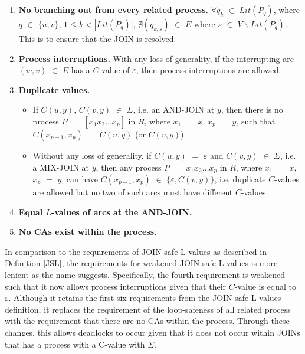 \begin{defn}
\begin{itemize}
\begin{enumerate}
            \item \textbf{No branching out from every related process.} $ 
            \forall q_k $ $ \in $ $ Lit(P_q) $, where $ q $ $ \in $ $ \{u,v\} $, $ 1 \leq k < |Lit(P_q)| $, $ \nexists (q_{k,s}) $ $ \in $ $ E $ where $ s $ $ \in $ $ V \backslash Lit(P_q) $. This is to ensure that the JOIN is resolved.
            \item \textbf{Process interruptions.} With any loss of generality, if the interrupting arc $ (w,v) $ $ \in $ $ E $ has a $ C $-value of $ \varepsilon $, then process interruptions are allowed.
            \item \textbf{Duplicate values.} 
            \begin{itemize}
                \item If $ C(u,y) $, $ C(v,y) $ $ \in $ $ \Sigma $, i.e. an AND-JOIN at $ y $, then there is no process $ P $ $ = $ $ [x_1 x_2 \ldots x_p] $ in $ R $, where $ x_1 $ $ = $ $ x $, $ x_p $ $ = $ $ y $, such that $ C(x_{p-1}, x_p ) $ $ = $ $ C(u,y) $ (or $ C(v,y) $).
                \item Without any loss of generality, if $ C(u,y) $ $ = $ $ \varepsilon $ and $ C(v,y) $ $ \in $ $ \Sigma $, i.e. a MIX-JOIN at $ y $, then any process $ P $ $ = $ $ x_1 x_2 \ldots x_p $ in $ R $, where $ x_1 $ $ = $ $ x $, $ x_p $ $ = $ $ y $, can have $ C(x_{p-1},x_p) $ $ \in $ $ \{ \varepsilon, C(v,y) \} $, i.e. duplicate $ C $-values are allowed but no two of such arcs must have different $ C $-values.
            \end{itemize}
            \item \textbf{Equal $ L $-values of arcs at the AND-JOIN.}
            \item \textbf{No CAs exist within the process.} 
        \end{enumerate}
    \end{itemize}
\end{defn}

In comparison to the requirements of JOIN-safe L-values as described in Definition \ref{JSL}, the requirements for weakened JOIN-safe L-values is more lenient as the name suggests. Specifically, the fourth requirement is weakened such that it now allows process interruptions given that their $ C $-value is equal to $ \varepsilon $. Although it retains the first six requirements from the JOIN-safe L-values definition, it replaces the requirement of the loop-safeness of all related process with the requirement that there are no CAs within the process. Through these changes, this allows deadlocks to occur given that it does not occur within JOINs that has a process with a C-value with $ \Sigma $. 

